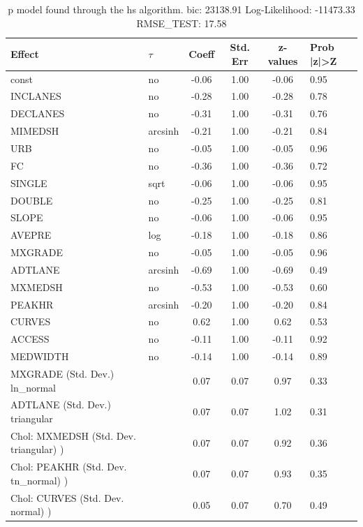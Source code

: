 \begin{table}
	\caption{p model found through the hs algorithm. bic: 23138.91 Log-Likelihood: -11473.33 RMSE_TEST: 17.58}
	\begin{center}
		\begin{tabular}{|l|l|c|c|c|l|}
			\hline
			Effect & $\tau$ & Coeff & Std. Err & z-values & Prob |z|>Z \\
			\hline
			const & no & -0.06 & 1.00 & -0.06 & 0.95 \\
			\hline
			INCLANES & no & -0.28 & 1.00 & -0.28 & 0.78 \\
			\hline
			DECLANES & no & -0.31 & 1.00 & -0.31 & 0.76 \\
			\hline
			MIMEDSH & arcsinh & -0.21 & 1.00 & -0.21 & 0.84 \\
			\hline
			URB & no & -0.05 & 1.00 & -0.05 & 0.96 \\
			\hline
			FC & no & -0.36 & 1.00 & -0.36 & 0.72 \\
			\hline
			SINGLE & sqrt & -0.06 & 1.00 & -0.06 & 0.95 \\
			\hline
			DOUBLE & no & -0.25 & 1.00 & -0.25 & 0.81 \\
			\hline
			SLOPE & no & -0.06 & 1.00 & -0.06 & 0.95 \\
			\hline
			AVEPRE & log & -0.18 & 1.00 & -0.18 & 0.86 \\
			\hline
			MXGRADE & no & -0.05 & 1.00 & -0.05 & 0.96 \\
			\hline
			ADTLANE & arcsinh & -0.69 & 1.00 & -0.69 & 0.49 \\
			\hline
			MXMEDSH & no & -0.53 & 1.00 & -0.53 & 0.60 \\
			\hline
			PEAKHR & arcsinh & -0.20 & 1.00 & -0.20 & 0.84 \\
			\hline
			CURVES & no & 0.62 & 1.00 & 0.62 & 0.53 \\
			\hline
			ACCESS & no & -0.11 & 1.00 & -0.11 & 0.92 \\
			\hline
			MEDWIDTH & no & -0.14 & 1.00 & -0.14 & 0.89 \\
			\hline
			MXGRADE (Std. Dev.) ln_normal &  & 0.07 & 0.07 & 0.97 & 0.33 \\
			\hline
			ADTLANE (Std. Dev.) triangular &  & 0.07 & 0.07 & 1.02 & 0.31 \\
			\hline
			 Chol: MXMEDSH (Std. Dev. triangular) ) &  & 0.07 & 0.07 & 0.92 & 0.36 \\
			\hline
			 Chol: PEAKHR (Std. Dev. tn_normal) ) &  & 0.07 & 0.07 & 0.93 & 0.35 \\
			\hline
			 Chol: CURVES (Std. Dev. normal) ) &  & 0.05 & 0.07 & 0.70 & 0.49 \\

\end{tabular}
\end{center}
\end{table}
